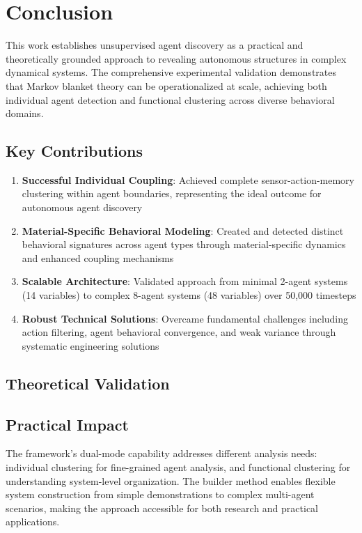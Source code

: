 \documentclass[10pt,conference]{IEEEtran}
\begin{document}
\section{Conclusion}
This work establishes unsupervised agent discovery as a practical and theoretically grounded approach to revealing autonomous structures in complex dynamical systems. The comprehensive experimental validation demonstrates that Markov blanket theory can be operationalized at scale, achieving both individual agent detection and functional clustering across diverse behavioral domains.

\subsection{Key Contributions}
\begin{enumerate}
  \item \textbf{Successful Individual Coupling}: Achieved complete sensor-action-memory clustering within agent boundaries, representing the ideal outcome for autonomous agent discovery
  \item \textbf{Material-Specific Behavioral Modeling}: Created and detected distinct behavioral signatures across agent types through material-specific dynamics and enhanced coupling mechanisms
  \item \textbf{Scalable Architecture}: Validated approach from minimal 2-agent systems (14 variables) to complex 8-agent systems (48 variables) over 50,000 timesteps
  \item \textbf{Robust Technical Solutions}: Overcame fundamental challenges including action filtering, agent behavioral convergence, and weak variance through systematic engineering solutions
\end{enumerate}

\subsection{Theoretical Validation}

\subsection{Practical Impact}
The framework's dual-mode capability addresses different analysis needs: individual clustering for fine-grained agent analysis, and functional clustering for understanding system-level organization. The builder method enables flexible system construction from simple demonstrations to complex multi-agent scenarios, making the approach accessible for both research and practical applications.
\end{document}
